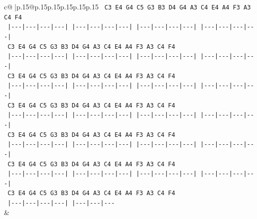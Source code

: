 \documentclass{article}
\begin{document}
{\begin{supertabular}{c@{$\;$}|p{.15\linewidth}@{}p{.15\linewidth}p{.15\linewidth}p{.15\linewidth}p{.15\linewidth}p{.15\linewidth}}
{{{\texttt{      C3  E4  G4  C5     G3  B3  D4  G4     A3  C4  E4  A4     F3  A3  C4  F4} \\
\texttt{      |{-}{-}{-}|{-}{-}{-}|{-}{-}{-}|{-}{-}{-}|   |{-}{-}{-}|{-}{-}{-}|{-}{-}{-}|{-}{-}{-}|   |{-}{-}{-}|{-}{-}{-}|{-}{-}{-}|{-}{-}{-}|   |{-}{-}{-}|{-}{-}{-}|{-}{-}{-}|{-}{-}{-}|} \\
\texttt{      C3  E4  G4  C5     G3  B3  D4  G4     A3  C4  E4  A4     F3  A3  C4  F4} \\
\texttt{      |{-}{-}{-}|{-}{-}{-}|{-}{-}{-}|{-}{-}{-}|   |{-}{-}{-}|{-}{-}{-}|{-}{-}{-}|{-}{-}{-}|   |{-}{-}{-}|{-}{-}{-}|{-}{-}{-}|{-}{-}{-}|   |{-}{-}{-}|{-}{-}{-}|{-}{-}{-}|{-}{-}{-}|} \\
\texttt{      C3  E4  G4  C5     G3  B3  D4  G4     A3  C4  E4  A4     F3  A3  C4  F4} \\
\texttt{      |{-}{-}{-}|{-}{-}{-}|{-}{-}{-}|{-}{-}{-}|   |{-}{-}{-}|{-}{-}{-}|{-}{-}{-}|{-}{-}{-}|   |{-}{-}{-}|{-}{-}{-}|{-}{-}{-}|{-}{-}{-}|   |{-}{-}{-}|{-}{-}{-}|{-}{-}{-}|{-}{-}{-}|} \\
\texttt{      C3  E4  G4  C5     G3  B3  D4  G4     A3  C4  E4  A4     F3  A3  C4  F4} \\
\texttt{      |{-}{-}{-}|{-}{-}{-}|{-}{-}{-}|{-}{-}{-}|   |{-}{-}{-}|{-}{-}{-}|{-}{-}{-}|{-}{-}{-}|   |{-}{-}{-}|{-}{-}{-}|{-}{-}{-}|{-}{-}{-}|   |{-}{-}{-}|{-}{-}{-}|{-}{-}{-}|{-}{-}{-}|} \\
\texttt{      C3  E4  G4  C5     G3  B3  D4  G4     A3  C4  E4  A4     F3  A3  C4  F4} \\
\texttt{      |{-}{-}{-}|{-}{-}{-}|{-}{-}{-}|{-}{-}{-}|   |{-}{-}{-}|{-}{-}{-}|{-}{-}{-}|{-}{-}{-}|   |{-}{-}{-}|{-}{-}{-}|{-}{-}{-}|{-}{-}{-}|   |{-}{-}{-}|{-}{-}{-}|{-}{-}{-}|{-}{-}{-}|} \\
\texttt{      C3  E4  G4  C5     G3  B3  D4  G4     A3  C4  E4  A4     F3  A3  C4  F4} \\
\texttt{      |{-}{-}{-}|{-}{-}{-}|{-}{-}{-}|{-}{-}{-}|   |{-}{-}{-}|{-}{-}{-}|{-}{-}{-}|{-}{-}{-}|   |{-}{-}{-}|{-}{-}{-}|{-}{-}{-}|{-}{-}{-}|   |{-}{-}{-}|{-}{-}{-}|{-}{-}{-}|{-}{-}{-}|} \\
\texttt{      C3  E4  G4  C5     G3  B3  D4  G4     A3  C4  E4  A4     F3  A3  C4  F4} \\
\texttt{      |{-}{-}{-}|{-}{-}{-}|{-}{-}{-}|{-}{-}{-}|   |{-}{-}{-}|{-}{-}{-}|{-}{-}{-}} \\
            }
        }
    }
    & \\ \\


\end{supertabular}}
\end{document}
